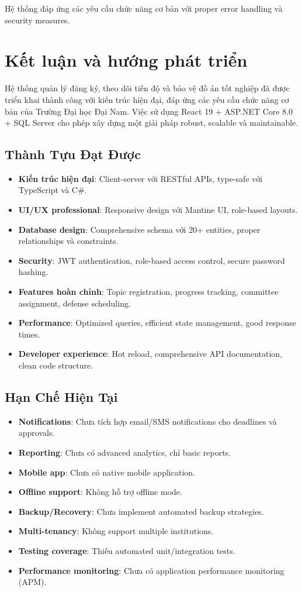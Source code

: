 \documentclass[conference,a4paper]{IEEEtran}
\begin{document}
Hệ thống đáp ứng các yêu cầu chức năng cơ bản với proper error handling và security measures.

\section{Kết luận và hướng phát triển}
Hệ thống quản lý đăng ký, theo dõi tiến độ và bảo vệ đồ án tốt nghiệp đã được triển khai thành công với kiến trúc hiện đại, đáp ứng các yêu cầu chức năng cơ bản của Trường Đại học Đại Nam. Việc sử dụng React 19 + ASP.NET Core 8.0 + SQL Server cho phép xây dựng một giải pháp robust, scalable và maintainable.

\subsection{Thành Tựu Đạt Được}
\begin{itemize}
  \item \textbf{Kiến trúc hiện đại}: Client-server với RESTful APIs, type-safe với TypeScript và C\#.
  \item \textbf{UI/UX professional}: Responsive design với Mantine UI, role-based layouts.
  \item \textbf{Database design}: Comprehensive schema với 20+ entities, proper relationships và constraints.
  \item \textbf{Security}: JWT authentication, role-based access control, secure password hashing.
  \item \textbf{Features hoàn chỉnh}: Topic registration, progress tracking, committee assignment, defense scheduling.
  \item \textbf{Performance}: Optimized queries, efficient state management, good response times.
  \item \textbf{Developer experience}: Hot reload, comprehensive API documentation, clean code structure.
\end{itemize}

\subsection{Hạn Chế Hiện Tại}
\begin{itemize}
  \item \textbf{Notifications}: Chưa tích hợp email/SMS notifications cho deadlines và approvals.
  \item \textbf{Reporting}: Chưa có advanced analytics, chỉ basic reports.
  \item \textbf{Mobile app}: Chưa có native mobile application.
  \item \textbf{Offline support}: Không hỗ trợ offline mode.
  \item \textbf{Backup/Recovery}: Chưa implement automated backup strategies.
  \item \textbf{Multi-tenancy}: Không support multiple institutions.
  \item \textbf{Testing coverage}: Thiếu automated unit/integration tests.
  \item \textbf{Performance monitoring}: Chưa có application performance monitoring (APM).
\end{itemize}
\end{document}
